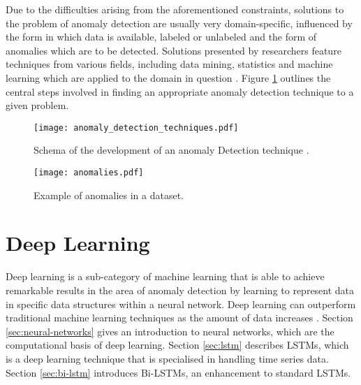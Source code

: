 Due to the difficulties arising from the aforementioned constraints, solutions to the problem of anomaly detection are usually very domain-specific, influenced by the form in which data is available, labeled or unlabeled and the form of anomalies which are to be detected. Solutions presented by researchers feature techniques from various fields, including data mining, statistics and machine learning which are applied to the domain in question \cite{chandola2009anomaly}. Figure \ref{fig:anomaly_technique} outlines the central steps involved in finding an appropriate anomaly detection technique to a given problem.


\begin{figure}[h]
  \centering
\texttt{[image: anomaly\_detection\_techniques.pdf]}\\ 
  \caption{Schema of the development of an anomaly Detection technique \cite{chandola2009anomaly}.}
  \label{fig:anomaly_technique}
\end{figure}

\begin{figure}[h]
  \centering
  \texttt{[image: anomalies.pdf]}\\
  \caption{Example of anomalies in a dataset.}
  \label{fig:anomaly_dataset}
\end{figure}




\section{Deep Learning \label{sec:deep-learning}}
Deep learning is a sub-category of machine learning that is able to achieve remarkable results in the area of anomaly detection by learning to represent data in specific data structures within a neural network. Deep learning can outperform traditional machine learning techniques as the amount of data increases \cite{chalapathy2019deep}. Section \ref{sec:neural-networks} gives an introduction to neural networks, which are the computational basis of deep learning. Section \ref{sec:lstm} describes LSTMs, which is a deep learning technique that is specialised in handling time series data. Section \ref{sec:bi-lstm} introduces Bi-LSTMs, an enhancement to standard LSTMs.
